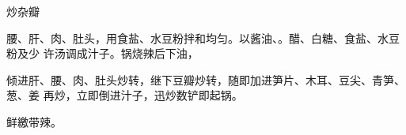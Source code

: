 \begin{recipe}{炒杂瓣}

\ingredients


\preparation

腰、肝、肉、肚头，用食盐、水豆粉拌和均匀。以酱油、。醋、白糖、食盐、水豆粉及少
许汤调成汁子。锅烧辣后下油，

倾进肝、腰、肉、肚头炒转，继下豆瓣炒转，随即加进笋片、木耳、豆尖、青笋、葱、姜
再炒，立即倒进汁子，迅炒数铲即起锅。

\features

鲜繳带辣。

\end{recipe}


